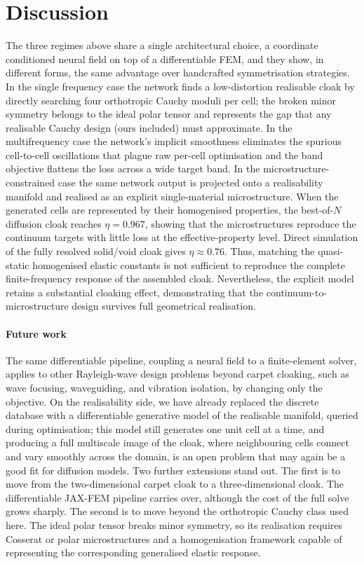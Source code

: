 \documentclass[preprint,12pt]{elsarticle}
\begin{document}
\section{Discussion}\label{sec:discussion}
The three regimes above share a single architectural choice, a coordinate conditioned neural field on top of a differentiable FEM, and they show, in different forms, the same advantage over handcrafted symmetrisation strategies. In the single frequency case the network finds a low-distortion realisable cloak by directly searching four orthotropic Cauchy moduli per cell; the broken minor symmetry belongs to the ideal polar tensor and represents the gap that any realisable Cauchy design (ours included) must approximate. In
the multifrequency case the network's implicit smoothness eliminates
the spurious cell-to-cell oscillations that plague raw per-cell
optimisation and the band objective flattens the loss across a wide
target band. In the microstructure-constrained case the same network
output is projected onto a realisability manifold and realised as an
explicit single-material microstructure. When the generated cells are represented by their homogenised properties, the best-of-$N$ diffusion cloak reaches $\eta=0.967$, showing that the microstructures reproduce the continuum targets with little loss at the effective-property level. Direct simulation of the fully resolved solid/void cloak gives $\eta\approx0.76$. Thus, matching the quasi-static homogenised elastic constants is not sufficient to reproduce the complete finite-frequency response of the assembled cloak. Nevertheless, the explicit model retains a substantial cloaking effect, demonstrating that the continuum-to-microstructure design survives full geometrical realisation.


\paragraph{Future work} The same differentiable pipeline, coupling a
neural field to a finite-element solver, applies to other Rayleigh-wave
design problems beyond carpet cloaking, such as wave focusing,
waveguiding, and vibration isolation, by changing only the objective. On
the realisability side, we have already replaced the discrete database
with a differentiable generative model of the realisable manifold,
queried during optimisation; this model still generates one unit cell at a
time, and producing a full multiscale image of the cloak, where
neighbouring cells connect and vary smoothly across the domain, is an
open problem that may again be a good fit for diffusion models. Two further extensions stand out. The first is to move from the
two-dimensional carpet cloak to a three-dimensional cloak. The
differentiable JAX-FEM pipeline carries over, although the cost of the
full solve grows sharply. The second is to move beyond the orthotropic
Cauchy class used here. The ideal polar tensor breaks minor symmetry,
so its realisation requires Cosserat or polar microstructures and a
homogenisation framework capable of representing the corresponding
generalised elastic response.
\end{document}
